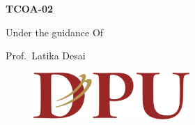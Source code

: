 \documentclass[12pt]{article}
\begin{document}
\vspace{\baselineskip}
\begin{Center}
\textbf{TCOA-02}
\end{Center}\par


\vspace{\baselineskip}
\begin{Center}
Under the guidance Of\end{Center}\par





\tab 
\vspace{\baselineskip}
\vspace{\baselineskip}

\vspace{\baselineskip}
\begin{Center}
{\fontsize{14pt}{16.8pt}\selectfont Prof.\  Latika Desai\par}
\end{Center}\par




\par


\vspace{\baselineskip}

\vspace{\baselineskip}

\vspace{\baselineskip}

\vspace{\baselineskip}

\vspace{\baselineskip}



\begin{figure}[H]
	\begin{Center}
		\includegraphics[width=2.33in,height=0.7in]{./media/image2.png}
	\end{Center}
\end{figure}


\end{document}
